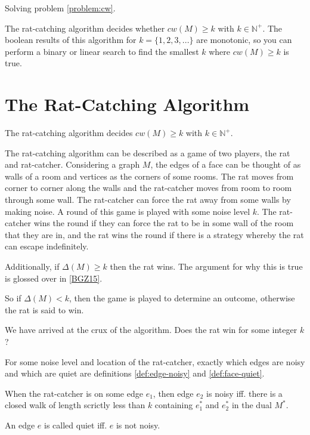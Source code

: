 \documentclass{article}
\begin{document}
			Solving problem \ref{problem:cw}.

			The rat-catching algorithm decides whether $cw(M) \geq k$ with $k \in \mathbb{N}^+$. The boolean results of this algorithm for $k=\{1,2,3,...\}$ are monotonic, so you can perform a binary or linear search to find the smallest $k$ where $cw(M) \geq k$ is true.


	\section{The Rat-Catching Algorithm}

		The rat-catching algorithm decides $cw(M) \geq k$ with $k \in \mathbb{N}^+$.

		The rat-catching algorithm can be described as a game of two players, the rat and rat-catcher. Considering a graph $M$, the edges of a face can be thought of as walls of a room and vertices as the corners of some rooms. The rat moves from corner to corner along the walls and the rat-catcher moves from room to room through some wall. The rat-catcher can force the rat away from some walls by making noise. A round of this game is played with some noise level $k$. The rat-catcher wins the round if they can force the rat to be in some wall of the room that they are in, and the rat wins the round if there is a strategy whereby the rat can escape indefinitely.

		Additionally, if $\Delta(M) \geq k$ then the rat wins. The argument for why this is true is glossed over in \ref{BGZ15}.

		So if $\Delta(M) < k$, then the game is played to determine an outcome, otherwise the rat is said to win.

		We have arrived at the crux of the algorithm. Does the rat win for some integer $k$?

		For some noise level and location of the rat-catcher, exactly which edges are noisy and which are quiet are definitions \ref{def:edge-noisy} and \ref{def:face-quiet}.

		\begin{definition}\label{def:edge-noisy}
			When the rat-catcher is on some edge $e_1$, then edge $e_2$ is noisy iff. there is a closed walk of length scrictly less than $k$ containing $e_1^*$ and $e_2^*$ in the dual $M^*$.
		\end{definition}

		An edge $e$ is called quiet iff. $e$ is not noisy.
\end{document}
